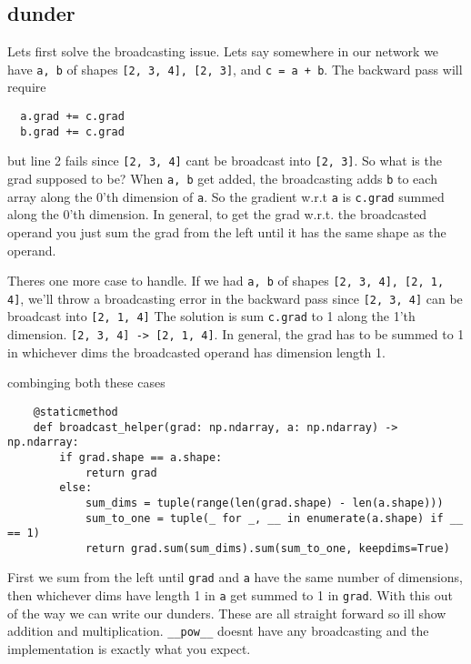 \documentclass[11pt]{article}
\begin{document}
\subsection{dunder}
Lets first solve the broadcasting issue. Lets say somewhere in our network we have \texttt{a, b} of shapes
\texttt{[2, 3, 4],  [2, 3]}, and \texttt{c = a + b}. The backward pass will require
\begin{verbatim}
  a.grad += c.grad
  b.grad += c.grad
\end{verbatim}
but line 2 fails since \texttt{[2, 3, 4]} cant be broadcast into \texttt{[2, 3]}. So what is the grad supposed to be?
When \texttt{a, b} get added, the broadcasting adds \texttt{b} to each array along the 0'th dimension of \texttt{a}. 
So the gradient w.r.t \texttt{a} is \texttt{c.grad} summed along the 0'th dimension. In general, to get the grad w.r.t. the broadcasted
operand you just sum the grad from the left until it has the same shape as the operand. 
\par Theres one more case to handle. If we had \texttt{a, b} of shapes \texttt{[2, 3, 4], [2, 1, 4]}, we'll throw a 
broadcasting error in the backward pass since \texttt{[2, 3, 4]} can be broadcast into \texttt{[2, 1, 4]}
The solution is sum \texttt{c.grad} to 1 along the 1'th dimension. \texttt{[2, 3, 4] -> [2, 1, 4]}. In general, the grad
has to be summed to 1 in whichever dims the broadcasted operand has dimension length 1. 
\par combinging both these cases
\begin{verbatim}
    @staticmethod
    def broadcast_helper(grad: np.ndarray, a: np.ndarray) -> np.ndarray:
        if grad.shape == a.shape:
            return grad
        else:
            sum_dims = tuple(range(len(grad.shape) - len(a.shape)))
            sum_to_one = tuple(_ for _, __ in enumerate(a.shape) if __ == 1)
            return grad.sum(sum_dims).sum(sum_to_one, keepdims=True)
\end{verbatim}
First we sum from the left until \texttt{grad} and \texttt{a} have the same number of dimensions, then whichever
dims have length 1 in \texttt{a} get summed to 1 in \texttt{grad}. With this out of the way we can write our dunders. 
These are all straight forward so ill show addition and multiplication. \texttt{\_\_pow\_\_} doesnt have 
any broadcasting and the implementation is exactly what you expect.
\end{document}
